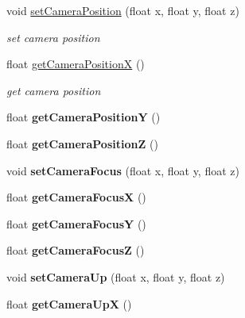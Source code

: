 \begin{DoxyCompactItemize}
void \hyperlink{class_render_engine_afd9aa16bd773fb102d7ee1bd711e4f12}{set\-Camera\-Position} (float x, float y, float z)
\begin{DoxyCompactList}\small\item\em set camera position \end{DoxyCompactList}\item 
float \hyperlink{class_render_engine_aba6e542657290bf6a94cab611066fc3e}{get\-Camera\-Position\-X} ()
\begin{DoxyCompactList}\small\item\em get camera position \end{DoxyCompactList}\item 
\hypertarget{class_render_engine_a5ac2b51f09ef60eae4f122c43d94bb8c}{float {\bfseries get\-Camera\-Position\-Y} ()}\label{class_render_engine_a5ac2b51f09ef60eae4f122c43d94bb8c}

\item 
\hypertarget{class_render_engine_a0cae00fa51bca7f4414dced857b2a909}{float {\bfseries get\-Camera\-Position\-Z} ()}\label{class_render_engine_a0cae00fa51bca7f4414dced857b2a909}

\item 
\hypertarget{class_render_engine_adfdba922aec083d0731ce8800a18f920}{void {\bfseries set\-Camera\-Focus} (float x, float y, float z)}\label{class_render_engine_adfdba922aec083d0731ce8800a18f920}

\item 
\hypertarget{class_render_engine_a994459d774d9020bc22286810a2dc6bb}{float {\bfseries get\-Camera\-Focus\-X} ()}\label{class_render_engine_a994459d774d9020bc22286810a2dc6bb}

\item 
\hypertarget{class_render_engine_a234ae8c0830f7798b08df87f6d2ad88d}{float {\bfseries get\-Camera\-Focus\-Y} ()}\label{class_render_engine_a234ae8c0830f7798b08df87f6d2ad88d}

\item 
\hypertarget{class_render_engine_a992122db2771284c812713a7e4dfc70c}{float {\bfseries get\-Camera\-Focus\-Z} ()}\label{class_render_engine_a992122db2771284c812713a7e4dfc70c}

\item 
\hypertarget{class_render_engine_a629a095a7453ad78e9b692e4e9522c64}{void {\bfseries set\-Camera\-Up} (float x, float y, float z)}\label{class_render_engine_a629a095a7453ad78e9b692e4e9522c64}

\item 
\hypertarget{class_render_engine_a9234c95800b9200a4296c1550c49bf26}{float {\bfseries get\-Camera\-Up\-X} ()}\label{class_render_engine_a9234c95800b9200a4296c1550c49bf26}


\end{DoxyCompactItemize}
